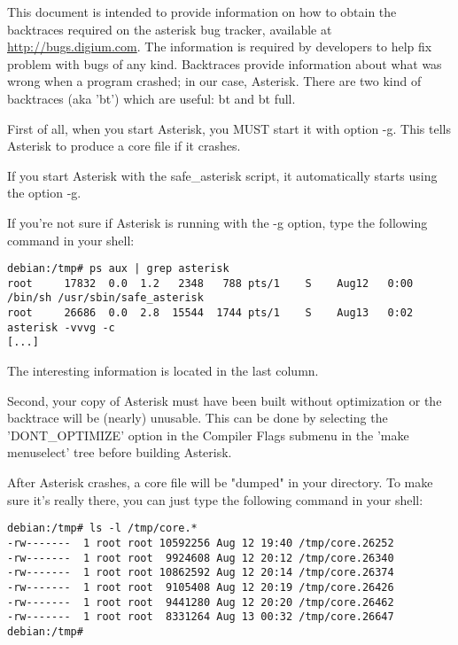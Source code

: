 This document is intended to provide information on how to obtain the
backtraces required on the asterisk bug tracker, available at
\url{http://bugs.digium.com}. The information is required by developers to
help fix problem with bugs of any kind. Backtraces provide information
about what was wrong when a program crashed; in our case,
Asterisk. There are two kind of backtraces (aka 'bt') which are
useful: bt and bt full.

First of all, when you start Asterisk, you MUST start it with option
-g. This tells Asterisk to produce a core file if it crashes.

If you start Asterisk with the safe\_asterisk script, it automatically
starts using the option -g.

If you're not sure if Asterisk is running with the -g option, type the
following command in your shell:

\begin{astlisting}
\begin{verbatim}
debian:/tmp# ps aux | grep asterisk
root     17832  0.0  1.2   2348   788 pts/1    S    Aug12   0:00 /bin/sh /usr/sbin/safe_asterisk
root     26686  0.0  2.8  15544  1744 pts/1    S    Aug13   0:02 asterisk -vvvg -c
[...]
\end{verbatim}
\end{astlisting}

The interesting information is located in the last column.

Second, your copy of Asterisk must have been built without
optimization or the backtrace will be (nearly) unusable. This can be
done by selecting the 'DONT\_OPTIMIZE' option in the Compiler Flags
submenu in the 'make menuselect' tree before building Asterisk.

After Asterisk crashes, a core file will be "dumped" in your 
directory. To make sure it's really there, you can just type the
following command in your shell:

\begin{astlisting}
\begin{verbatim}
debian:/tmp# ls -l /tmp/core.*
-rw-------  1 root root 10592256 Aug 12 19:40 /tmp/core.26252
-rw-------  1 root root  9924608 Aug 12 20:12 /tmp/core.26340
-rw-------  1 root root 10862592 Aug 12 20:14 /tmp/core.26374
-rw-------  1 root root  9105408 Aug 12 20:19 /tmp/core.26426
-rw-------  1 root root  9441280 Aug 12 20:20 /tmp/core.26462
-rw-------  1 root root  8331264 Aug 13 00:32 /tmp/core.26647
debian:/tmp#
\end{verbatim}
\end{astlisting}

